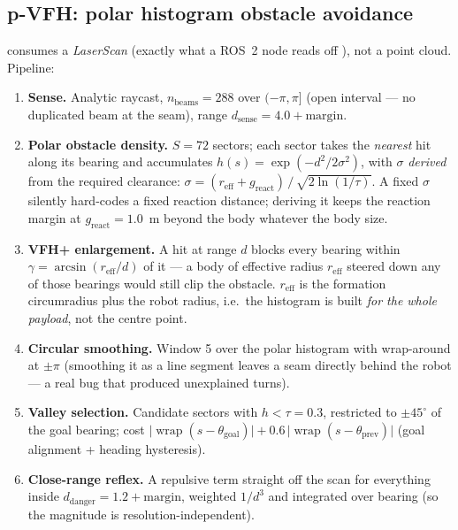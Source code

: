 \subsection{p-VFH: polar histogram obstacle avoidance}

 consumes a \emph{LaserScan} (exactly what a ROS~2 node
reads off ), not a point cloud. Pipeline:

\begin{enumerate}[leftmargin=1.9em]
\item \textbf{Sense.} Analytic raycast, $n_{\mathrm{beams}} = 288$ over
$(-\pi, \pi]$ (open interval --- no duplicated beam at the seam), range
$d_{\mathrm{sense}} = 4.0 + \text{margin}$.
\item \textbf{Polar obstacle density.} $S = 72$ sectors; each sector takes the
\emph{nearest} hit along its bearing and accumulates
$h(s) = \exp(-d^2 / 2\sigma^2)$, with
$\sigma$ \emph{derived} from the required clearance:
$\sigma = (r_{\mathrm{eff}} + g_{\mathrm{react}})\,/\,\sqrt{2\ln(1/\tau)}$.
A fixed $\sigma$ silently hard-codes a fixed reaction distance; deriving it
keeps the reaction margin at $g_{\mathrm{react}} = 1.0$~m beyond the body
whatever the body size.
\item \textbf{VFH+ enlargement.} A hit at range $d$ blocks every bearing
within $\gamma = \arcsin(r_{\mathrm{eff}}/d)$ of it --- a body of effective
radius $r_{\mathrm{eff}}$ steered down any of those bearings would still clip
the obstacle. $r_{\mathrm{eff}}$ is the formation circumradius plus the robot
radius, i.e.\ the histogram is built \emph{for the whole payload}, not the
centre point.
\item \textbf{Circular smoothing.} Window 5 over the polar histogram with
wrap-around at $\pm\pi$ (smoothing it as a line segment leaves a seam
directly behind the robot --- a real bug that produced unexplained turns).
\item \textbf{Valley selection.} Candidate sectors with $h < \tau = 0.3$,
restricted to $\pm 45^\circ$ of the goal bearing; cost
$\lvert \operatorname{wrap}(s - \theta_{\mathrm{goal}})\rvert
+ 0.6\,\lvert \operatorname{wrap}(s - \theta_{\mathrm{prev}})\rvert$ (goal
alignment + heading hysteresis).
\item \textbf{Close-range reflex.} A repulsive term straight off the scan for
everything inside $d_{\mathrm{danger}} = 1.2 + \text{margin}$, weighted
$1/d^3$ and integrated over bearing (so the magnitude is resolution-independent).
\end{enumerate}

